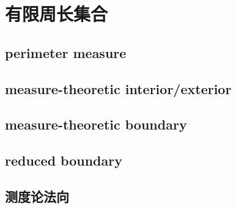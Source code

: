 \section{有限周长集合}
\label{b1:sec:2704}


\subsection{perimeter measure}
\label{b1:subsec:270401}

\subsection{measure-theoretic interior/exterior}
\label{b1:subsec:270402}

\subsection{measure-theoretic boundary}
\label{b1:subsec:270403}

\subsection{reduced boundary}
\label{b1:subsec:270404}

\subsection{测度论法向}
\label{b1:subsec:270405}


